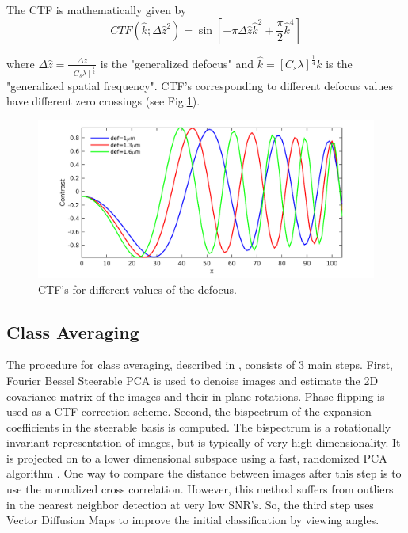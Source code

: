 \documentclass{article}
\begin{document}
The CTF is mathematically given by \cite{frankctf}
\begin{equation}
CTF(\hat{k};\Delta\hat{z}^2)= \sin[-\pi \Delta\hat{z}\hat{k}^2 + \frac{\pi}{2} \hat{k}^4]
\label{eq:ctf}
\end{equation}

where 
$\Delta\hat{z}=\frac{\Delta z}{[C_s \lambda]^{\frac{1}{2}}}$ is the "generalized defocus" and $\hat{k}=[C_s \lambda]^{\frac{1}{4}}k$ is the "generalized spatial frequency". CTF's corresponding to different defocus values have different zero crossings (see Fig.\ref{fig:ctf}).

\begin{figure}
\begin{center}
\includegraphics[scale=0.4]{ctfeg_fig.png}
\caption{CTF's for different values of the defocus.}\label{fig:ctf}
\end{center}

\end{figure}


\subsection{Class Averaging}
The procedure for class averaging, described in \cite{zhao}, consists of 3 main steps. First, Fourier Bessel Steerable PCA is used to denoise images and estimate the 2D covariance matrix of the images and their in-plane rotations. Phase flipping is used as a CTF correction scheme. Second, the bispectrum of the expansion coefficients in the steerable basis is computed. The bispectrum is a rotationally invariant representation of images, but is typically of very high dimensionality. It is projected on to a lower dimensional subspace using a fast, randomized PCA algorithm \cite{rokhlin}. One way to compare the distance between images after this step is to use the normalized cross correlation. However, this method suffers from outliers in the nearest neighbor detection at very low SNR's. So, the third step uses Vector Diffusion Maps to improve the initial classification by viewing angles.
\end{document}
